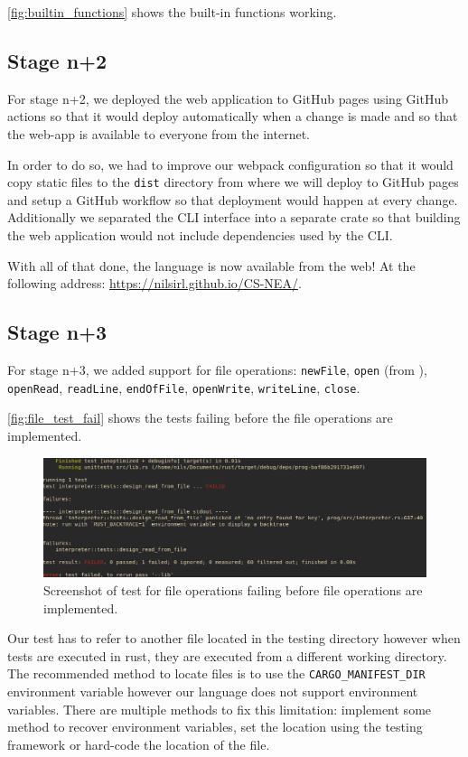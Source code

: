 \documentclass{article}
\begin{document}
\autoref{fig:builtin_functions} shows the built-in functions working.

\subsection{Stage n+2}

For stage n+2, we deployed the web application to GitHub pages using GitHub
actions so that it would deploy automatically when a change is made and so that
the web-app is available to everyone from the internet.

In order to do so, we had to improve our webpack configuration so that it would
copy static files to the \texttt{dist} directory from where we will deploy to
GitHub pages and setup a GitHub workflow so that deployment would happen at
every change. Additionally we separated the CLI interface into a separate crate
so that building the web application would not include dependencies used by the
CLI.

With all of that done, the language is now available from the web! At the
following address: \url{https://nilsirl.github.io/CS-NEA/}.

\subsection{Stage n+3}

For stage n+3, we added support for file operations: \texttt{newFile},
\texttt{open} (from ), \texttt{openRead}, \texttt{readLine},
\texttt{endOfFile}, \texttt{openWrite}, \texttt{writeLine}, \texttt{close}.

\autoref{fig:file_test_fail} shows the tests failing before the file operations
are implemented.

\begin{figure}
	\includegraphics[width=\textwidth]{file_test_fail}
	\caption{Screenshot of test for file operations failing before file
	operations are implemented.}
	\label{fig:file_test_fail}
\end{figure}

Our test has to refer to another file located in the testing directory however
when tests are executed in rust, they are executed from a different working
directory. The recommended method to locate files is to use the
\texttt{CARGO\_MANIFEST\_DIR} environment variable however our language does
not support environment variables. There are multiple methods to fix this
limitation: implement some method to recover environment variables, set the
location using the testing framework or hard-code the location of the file.
\end{document}
